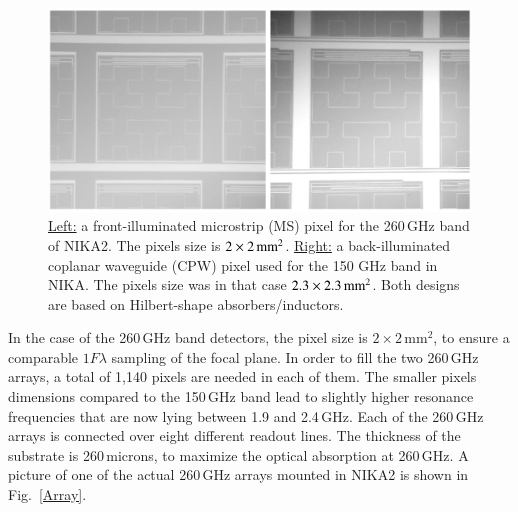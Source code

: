 \documentclass[]{aa} %
\begin{document}
\begin{figure}[h]
   \centering
  	\includegraphics[width=.95\linewidth]{fig3_AB.png}
     \caption{\underline{Left:} a front-illuminated microstrip (MS) pixel for the 260\,GHz band of NIKA2. The pixels size is $2\times2\textrm{\,mm}^2$. \underline{Right:} a back-illuminated coplanar waveguide (CPW) pixel used for the 150 GHz band in NIKA. The pixels size was in that case $2.3\times2.3\textrm{\,mm}^2$. Both designs are based on Hilbert-shape absorbers/inductors.}
         \label{Pixels}
\end{figure}

In the case of the 260\,GHz band detectors, the pixel size is $2\times 2\mathrm{\,mm}^2$, to ensure a comparable $1 F \lambda$ sampling of the focal plane. In order to fill the two 260\,GHz arrays, a total of 1,140 pixels are needed in each of them. The smaller pixels dimensions compared to the 150\,GHz band lead to slightly higher resonance frequencies that are now lying between 1.9 and 2.4\,GHz. Each of the 260\,GHz arrays is connected over eight different readout lines. The thickness of the substrate is 260\,microns, to maximize the optical absorption at 260\,GHz. A picture of one of the actual 260\,GHz arrays mounted in NIKA2 is shown in Fig.~\ref{Array}.
\end{document}
